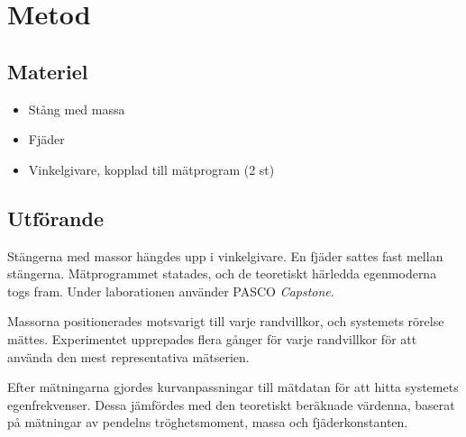 \section{Metod}
\subsection{Materiel}
\begin{itemize}
    \item Stång med massa
    \item Fjäder
    \item Vinkelgivare, kopplad till mätprogram (2 st)
\end{itemize}

\subsection{Utförande}
Stängerna med massor hängdes upp i vinkelgivare. En fjäder sattes fast mellan stängerna. Mätprogrammet statades, och de teoretiskt härledda egenmoderna togs fram. Under laborationen använder PASCO \emph{Capstone}.

Massorna positionerades motsvarigt till varje randvillkor, och systemets rörelse mättes. Experimentet upprepades flera gånger för varje randvillkor för att använda den mest representativa mätserien.

Efter mätningarna gjordes kurvanpassningar till mätdatan för att hitta systemets egenfrekvenser. Dessa jämfördes med den teoretiskt beräknade värdenna, baserat på mätningar av pendelns tröghetsmoment, massa och fjäderkonstanten.